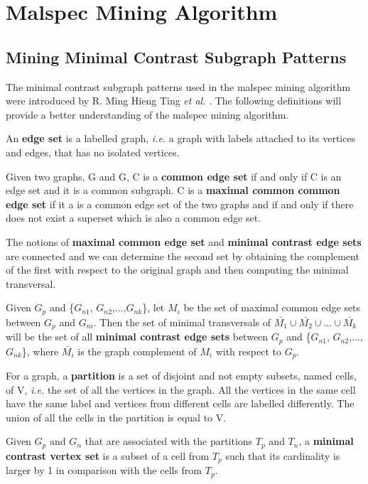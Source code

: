 \chapter{Malspec Mining Algorithm}
\label{chapter:third-chapter}

\section{Mining Minimal Contrast Subgraph Patterns}
\label{third:graph-defs}

The minimal contrast subgraph patterns used in the malspec mining algorithm were introduced by R. Ming Hieng Ting \textit{et al.} \cite{minimal-contrast-subgraph}. The following definitions will provide a better understanding of the malspec mining algorithm.

An \textbf{edge set} is a labelled graph, \textit{i.e.} a graph with labels attached to its vertices and edges, that has no isolated vertices.

Given two graphs, G and G, C is a \textbf{common edge set} if and only if C is an edge set and it is a common subgraph. C is a \textbf{maximal common common edge set} if it a is a common edge set of the two graphs and if and only if there does not exist a superset which is also a common edge set.

The notions of \textbf{maximal common edge set} and \textbf{minimal contrast edge sets} are connected and we can determine the second set by obtaining the complement of the first with respect to the original graph and then computing the minimal transversal.

Given $G_{p}$ and \{$G_{n1}$, $G_{n2}$,...,$G_{nk}$\}, let $M_{i}$ be the set of maximal common edge sets between $G_{p}$ and $G_{ni}$. Then the set of minimal transversals of $\bar{M_{1}} \cup \bar{M_{2}} \cup ... \cup \bar{M_{k}}$ will be the set of all \textbf{minimal contrast edge sets} between $G_{p}$ and \{$G_{n1}$, $G_{n2}$,...,$G_{nk}$\}, where $\bar{M_{i}}$ is the graph complement of $M_{i}$ with respect to $G_{p}$.

For a graph, a \textbf{partition} is a set of disjoint and not empty subsets, named cells, of V, \textit{i.e.} the set of all the vertices in the graph. All the vertices in the same cell have the same label and vertices from different cells are labelled differently. The union of all the cells in the partition is equal to V.

Given $G_{p}$ and $G_{n}$ that are associated with the partitions $T_{p}$ and $T_{n}$, a \textbf{minimal contrast vertex set} is a subset of a cell from $T_{p}$ such that its cardinality is larger by 1 in comparison with the cells from $T_{p}$.

